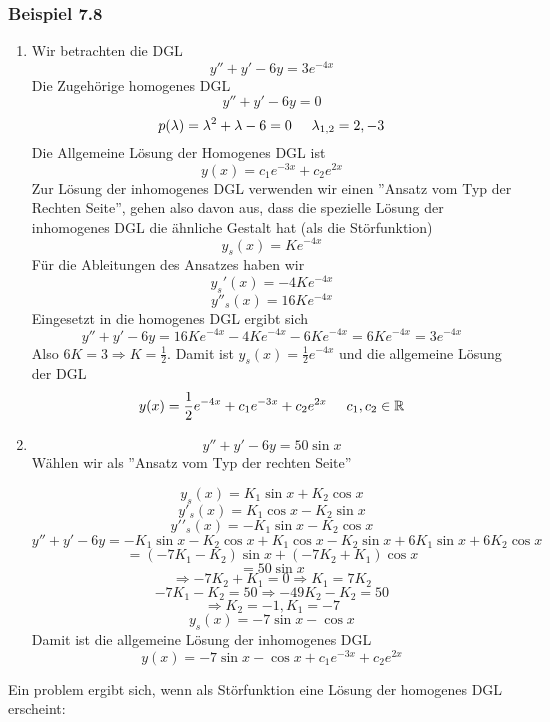 \subsubsection*{Beispiel 7.8}
\begin{enumerate}
\item Wir betrachten die DGL $$y''+y'-6y=3e^{-4x}$$Die Zugehörige homogenes DGL $$y''+y'-6y=0$$$$p(\lambda)=\lambda^2+\lambda-6=0\text{\hspace{5mm}}\lambda_{1,2}=2,-3$$ Die Allgemeine Lösung der Homogenes DGL ist $$y(x)=c_1e^{-3x}+c_2e^{2x}$$ Zur Lösung der inhomogenes DGL verwenden wir einen ''Ansatz vom Typ der Rechten Seite'', gehen also davon aus, dass die spezielle Lösung der inhomogenes DGL die ähnliche Gestalt hat (als die Störfunktion) $$y_s(x)=Ke^{-4x}$$Für die Ableitungen des Ansatzes haben wir $$y_s'(x)=-4Ke^{-4x}$$$$y''_s(x)=16Ke^{-4x}$$Eingesetzt in die homogenes DGL ergibt sich $$y''+y'-6y=16Ke^{-4x}-4Ke^{-4x}-6Ke^{-4x}=6Ke^{-4x}=3e^{-4x}$$Also $6K=3\Rightarrow K=\frac{1}{2}$. Damit ist $y_s(x)=\frac{1}{2}e^{-4x}$ und die allgemeine Lösung der DGL $$y(x)=\frac{1}{2}e^{-4x}+c_1e^{-3x}+c_2e^{2x}\text{\hspace{5mm}}c_1,c_2\in\mathbb{R}$$
\item $$y''+y'-6y=50\sin x$$ Wählen wir als ''Ansatz vom Typ der rechten Seite''

$${y_s}(x) = {K_1}\sin x + {K_2}\cos x$$
$$y{'_s}(x) = {K_1}\cos x - {K_2}\sin x$$
$$y'{'_s}(x) =  - {K_1}\sin x - {K_2}\cos x$$
$$y'' + y' - 6y =  - {K_1}\sin x - {K_2}\cos x + {K_1}\cos x - {K_2}\sin x + 6{K_1}\sin x + 6{K_2}\cos x$$
$$ = ( - 7{K_1} - {K_2})\sin x + ( - 7{K_2} + {K_1})\cos x$$
$$ = 50\sin x$$
$$ \Rightarrow  - 7{K_2} + {K_1} = 0 \Rightarrow {K_1} = 7{K_2}$$
$$ - 7{K_1} - {K_2} = 50 \Rightarrow  - 49{K_2} - {K_2} = 50$$
$$ \Rightarrow {K_2} =  - 1,{K_1} =  - 7$$
$$y_s(x)=-7\sin x-\cos x$$
Damit ist die allgemeine Lösung der inhomogenes DGL $$y(x)=-7\sin x-\cos x+c_1e^{-3x}+c_2e^{2x}$$
\end{enumerate}
Ein problem ergibt sich, wenn als Störfunktion eine Lösung der homogenes DGL erscheint:
